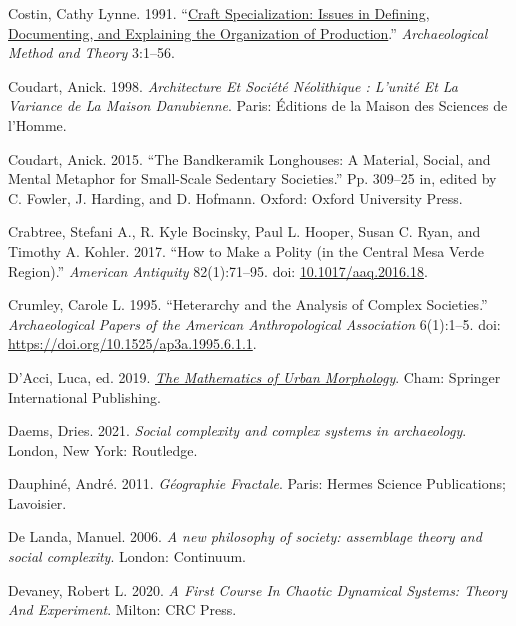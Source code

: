 \documentclass[
  12pt,
]{book}
\newlength{\cslhangindent}
\newlength{\cslentryspacingunit} %
\newenvironment{CSLReferences}[2] %
 {%
  \setlength{\parindent}{0pt}
  \ifodd #1
  \let\oldpar\par
  \def\par{\hangindent=\cslhangindent\oldpar}
  \fi
  \setlength{\parskip}{#2\cslentryspacingunit}
 }%
 {}
\begin{document}
\begin{CSLReferences}{1}{0}
\leavevmode{}%
Costin, Cathy Lynne. 1991. {``\href{https://www.jstor.org/stable/20170212}{Craft Specialization: Issues in Defining, Documenting, and Explaining the Organization of Production}.''} \emph{Archaeological Method and Theory} 3:1--56.

\leavevmode{}%
Coudart, Anick. 1998. \emph{Architecture Et Société Néolithique : L'unité Et La Variance de La Maison Danubienne}. Paris: Éditions de la Maison des Sciences de l'Homme.

\leavevmode{}%
Coudart, Anick. 2015. {``The Bandkeramik Longhouses: A Material, Social, and Mental Metaphor for Small-Scale Sedentary Societies.''} Pp. 309--25 in, edited by C. Fowler, J. Harding, and D. Hofmann. Oxford: Oxford University Press.

\leavevmode{}%
Crabtree, Stefani A., R. Kyle Bocinsky, Paul L. Hooper, Susan C. Ryan, and Timothy A. Kohler. 2017. {``How to Make a Polity (in the Central Mesa Verde Region).''} \emph{American Antiquity} 82(1):71--95. doi: \href{https://doi.org/10.1017/aaq.2016.18}{10.1017/aaq.2016.18}.

\leavevmode{}%
Crumley, Carole L. 1995. {``Heterarchy and the Analysis of Complex Societies.''} \emph{Archaeological Papers of the American Anthropological Association} 6(1):1--5. doi: \url{https://doi.org/10.1525/ap3a.1995.6.1.1}.

\leavevmode{}%
D'Acci, Luca, ed. 2019. \emph{\href{https://doi.org/10.1007/978-3-030-12381-9}{The Mathematics of Urban Morphology}}. Cham: Springer International Publishing.

\leavevmode{}%
Daems, Dries. 2021. \emph{Social complexity and complex systems in archaeology}. London, New York: Routledge.

\leavevmode{}%
Dauphiné, André. 2011. \emph{Géographie Fractale}. Paris: Hermes Science Publications; Lavoisier.

\leavevmode{}%
De Landa, Manuel. 2006. \emph{A new philosophy of society: assemblage theory and social complexity}. London: Continuum.

\leavevmode{}%
Devaney, Robert L. 2020. \emph{A First Course In Chaotic Dynamical Systems: Theory And Experiment}. Milton: CRC Press.


\end{CSLReferences}
\end{document}
